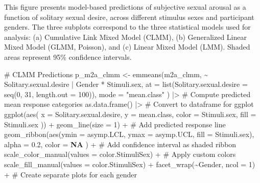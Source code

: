\documentclass[
  bookmarksnumbered]{article}
\newenvironment{Shaded}{\begin{snugshade}}{\end{snugshade}}
\newcommand{\AttributeTok}[1]{\textcolor[rgb]{0.80,0.80,0.80}{#1}}
\newcommand{\CommentTok}[1]{\textcolor[rgb]{0.50,0.62,0.50}{#1}}
\newcommand{\ConstantTok}[1]{\textcolor[rgb]{0.86,0.64,0.64}{\textbf{#1}}}
\newcommand{\DecValTok}[1]{\textcolor[rgb]{0.86,0.86,0.80}{#1}}
\newcommand{\FloatTok}[1]{\textcolor[rgb]{0.75,0.75,0.82}{#1}}
\newcommand{\FunctionTok}[1]{\textcolor[rgb]{0.94,0.94,0.56}{#1}}
\newcommand{\NormalTok}[1]{\textcolor[rgb]{0.80,0.80,0.80}{#1}}
\newcommand{\OtherTok}[1]{\textcolor[rgb]{0.94,0.94,0.56}{#1}}
\newcommand{\SpecialCharTok}[1]{\textcolor[rgb]{0.86,0.64,0.64}{#1}}
\newcommand{\StringTok}[1]{\textcolor[rgb]{0.80,0.58,0.58}{#1}}
\begin{document}
This figure presents model-based predictions of subjective sexual arousal as a function of solitary sexual desire, across different stimulus sexes and participant genders. The three subplots correspond to the three statistical models used for analysis: (a) Cumulative Link Mixed Model (CLMM), (b) Generalized Linear Mixed Model (GLMM, Poisson), and (c) Linear Mixed Model (LMM). Shaded areas represent 95\% confidence intervals.

\begin{Shaded}
\begin{Highlighting}[]
\CommentTok{\# CLMM Predictions}
\NormalTok{p\_m2a\_clmm }\OtherTok{\textless{}{-}} \FunctionTok{emmeans}\NormalTok{(m2a\_clmm, }\SpecialCharTok{\textasciitilde{}}\NormalTok{ Solitary.sexual.desire }\SpecialCharTok{|}\NormalTok{ Gender }\SpecialCharTok{*}\NormalTok{ Stimuli.sex,}
  \AttributeTok{at =} \FunctionTok{list}\NormalTok{(}\AttributeTok{Solitary.sexual.desire =} \FunctionTok{seq}\NormalTok{(}\DecValTok{0}\NormalTok{, }\DecValTok{31}\NormalTok{, }\AttributeTok{length.out =} \DecValTok{100}\NormalTok{)),}
  \AttributeTok{mode =} \StringTok{"mean.class"}
\NormalTok{) }\SpecialCharTok{|\textgreater{}} \CommentTok{\# Compute predicted mean response categories}
  \FunctionTok{as.data.frame}\NormalTok{() }\SpecialCharTok{|\textgreater{}} \CommentTok{\# Convert to dataframe for ggplot}
  \FunctionTok{ggplot}\NormalTok{(}\FunctionTok{aes}\NormalTok{(}
    \AttributeTok{x =}\NormalTok{ Solitary.sexual.desire, }\AttributeTok{y =}\NormalTok{ mean.class,}
    \AttributeTok{color =}\NormalTok{ Stimuli.sex, }\AttributeTok{fill =}\NormalTok{ Stimuli.sex}
\NormalTok{  )) }\SpecialCharTok{+}
  \FunctionTok{geom\_line}\NormalTok{(}\AttributeTok{size =} \DecValTok{1}\NormalTok{) }\SpecialCharTok{+} \CommentTok{\# Add predicted response line}
  \FunctionTok{geom\_ribbon}\NormalTok{(}\FunctionTok{aes}\NormalTok{(}\AttributeTok{ymin =}\NormalTok{ asymp.LCL, }\AttributeTok{ymax =}\NormalTok{ asymp.UCL, }\AttributeTok{fill =}\NormalTok{ Stimuli.sex),}
    \AttributeTok{alpha =} \FloatTok{0.2}\NormalTok{, }\AttributeTok{color =} \ConstantTok{NA}
\NormalTok{  ) }\SpecialCharTok{+} \CommentTok{\# Add confidence interval as shaded ribbon}
  \FunctionTok{scale\_color\_manual}\NormalTok{(}\AttributeTok{values =}\NormalTok{ color.StimuliSex) }\SpecialCharTok{+} \CommentTok{\# Apply custom colors}
  \FunctionTok{scale\_fill\_manual}\NormalTok{(}\AttributeTok{values =}\NormalTok{ color.StimuliSex) }\SpecialCharTok{+}
  \FunctionTok{facet\_wrap}\NormalTok{(}\SpecialCharTok{\textasciitilde{}}\NormalTok{Gender, }\AttributeTok{ncol =} \DecValTok{1}\NormalTok{) }\SpecialCharTok{+} \CommentTok{\# Create separate plots for each gender}

\end{Highlighting}
\end{Shaded}
\end{document}
